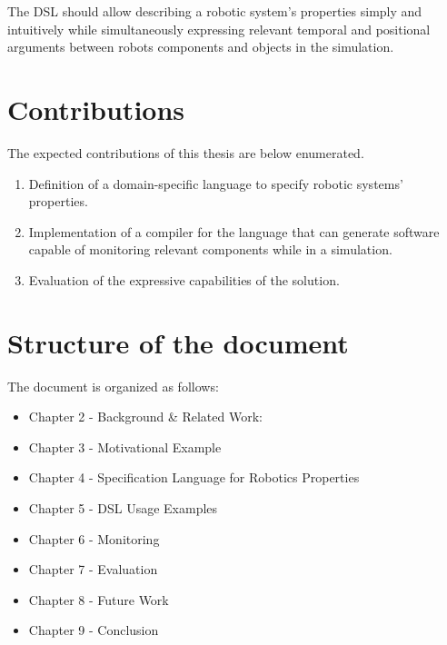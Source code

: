 The DSL should allow describing a robotic system's properties simply and intuitively while simultaneously expressing relevant temporal and positional arguments between robots components and objects in the simulation.


\section{Contributions}
\label{sec:contributions}

The expected contributions of this thesis are below enumerated.

\begin{enumerate}
    \item Definition of a domain-specific language to specify robotic systems' properties.
    \item Implementation of a compiler for the language that can generate software capable of monitoring relevant components while in a simulation.
    \item Evaluation of the expressive capabilities of the solution.
\end{enumerate}

\section{Structure of the document}
\label{sec:structure}

The document is organized as follows:

\begin{itemize}
    \item Chapter 2 - Background \& Related Work:
    \item Chapter 3 - Motivational Example
    \item Chapter 4 - Specification Language for Robotics Properties
    \item Chapter 5 - DSL Usage Examples
    \item Chapter 6 - Monitoring
    \item Chapter 7 - Evaluation 
    \item Chapter 8 - Future Work
    \item Chapter 9 - Conclusion
\end{itemize}
